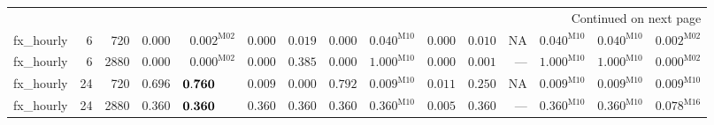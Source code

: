 \documentclass[10pt,a4paper]{article}
\begin{document}
\begin{longtable}{@{}lrrrrrrrrrrrrrr@{}}
\midrule
\endhead
\midrule\multicolumn{15}{r}{Continued on next page}\\\endfoot
\bottomrule\endlastfoot
fx\_hourly & 6 & 720 & $0.000$ & $0.002^{\mathrm{M02}}$ & $0.000$ & $0.019$ & $0.000$ & $0.040^{\mathrm{M10}}$ & $0.000$ & $0.010$ & \textsc{NA} & $0.040^{\mathrm{M10}}$ & $0.040^{\mathrm{M10}}$ & $0.002^{\mathrm{M02}}$ \\
fx\_hourly & 6 & 2880 & $0.000$ & $0.000^{\mathrm{M02}}$ & $0.000$ & $\mathbf{0.385}$ & $0.000$ & $\mathbf{1.000}^{\mathrm{M10}}$ & $0.000$ & $0.001$ & --- & $\mathbf{1.000}^{\mathrm{M10}}$ & $\mathbf{1.000}^{\mathrm{M10}}$ & $0.000^{\mathrm{M02}}$ \\
fx\_hourly & 24 & 720 & $\mathbf{0.696}$ & $\mathbf{0.760}\hphantom{^{\mathrm{M00}}}$ & $0.009$ & $0.000$ & $\mathbf{0.792}$ & $0.009^{\mathrm{M10}}$ & $0.011$ & $\mathbf{0.250}$ & \textsc{NA} & $0.009^{\mathrm{M10}}$ & $0.009^{\mathrm{M10}}$ & $0.009^{\mathrm{M10}}$ \\
fx\_hourly & 24 & 2880 & $\mathbf{0.360}$ & $\mathbf{0.360}\hphantom{^{\mathrm{M00}}}$ & $\mathbf{0.360}$ & $\mathbf{0.360}$ & $\mathbf{0.360}$ & $\mathbf{0.360}^{\mathrm{M10}}$ & $0.005$ & $\mathbf{0.360}$ & --- & $\mathbf{0.360}^{\mathrm{M10}}$ & $\mathbf{0.360}^{\mathrm{M10}}$ & $0.078^{\mathrm{M16}}$ \\
\end{longtable}
\end{document}
